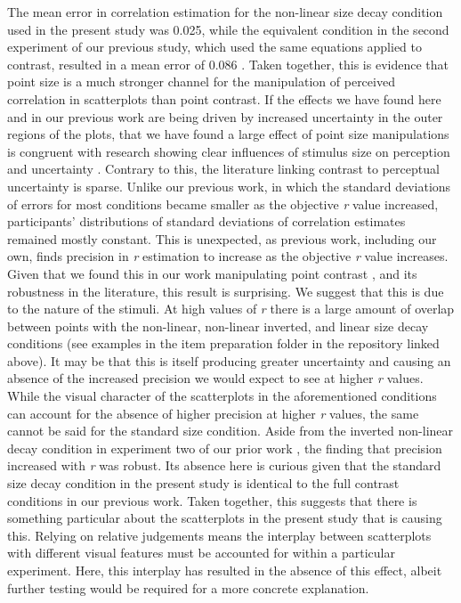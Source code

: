 \documentclass{vgtc}                          %
\begin{document}
The mean error in correlation estimation for the non-linear size decay condition used
in the present study was 0.025, while the equivalent condition in the second experiment
of our previous study, which used the same equations applied to contrast, resulted
in a mean error of 0.086 \cite{strain_2023}. Taken together, this is evidence that point size is a much stronger channel for the manipulation of perceived correlation in scatterplots than point contrast. If the effects we have found here and in our previous work
are being driven by increased uncertainty in the outer regions of the plots,
that we have found a large effect of point size manipulations is congruent
with research showing clear influences of stimulus
size on perception and uncertainty \cite{hong_2021, grice_1983, alais_2004}. Contrary to this, the literature linking contrast to perceptual uncertainty is sparse. Unlike our previous work, in which the standard deviations of errors for most conditions became smaller as the objective \emph{r} value increased, participants'
distributions of standard deviations of correlation estimates remained mostly constant. This
is unexpected, as previous work, including our own, finds precision
in \emph{r} estimation to increase as the objective \emph{r} value increases. Given that we found
this in our work manipulating point contrast \cite{strain_2023}, and
its robustness in the literature, this result is surprising. We suggest that this
is due to the nature of the stimuli. At high values of \emph{r} there is a large amount
of overlap between points with the non-linear, non-linear inverted, and linear size decay conditions (see examples in the item preparation folder in the repository linked above). It may be that this
is itself producing greater uncertainty and causing an absence of the increased
precision we would expect to see at higher \emph{r} values. While the visual character
of the scatterplots in the aforementioned conditions can account for the absence
of higher precision at higher \emph{r} values, the same cannot be said for the standard size
condition. Aside from the inverted non-linear decay condition in experiment two of
our prior work \cite{strain_2023}, the finding that precision increased with \emph{r}
was robust. Its absence here is curious given that the standard size decay condition in
the present study is identical to the full contrast conditions in our previous work.
Taken together, this suggests that there is something particular about the scatterplots
in the present study that is causing this. Relying on relative judgements means
the interplay between scatterplots with different visual features must be accounted for within a particular experiment. Here, this interplay has resulted in the absence of this effect, albeit
further testing would be required for a more concrete explanation.
\end{document}
